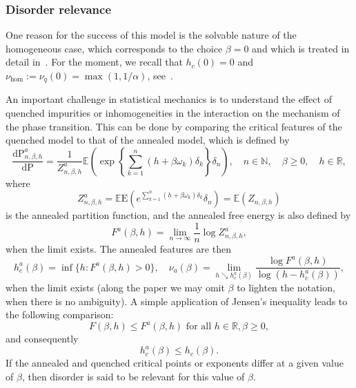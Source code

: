 \documentclass[10pt]{amsart}
\theoremstyle{definition}\newtheorem{defi}[theo]{Definition}\newtheorem{rema}[theo]{Remark}\newtheorem{exam}[theo]{Example}\newtheorem{exem}[theo]{Example}\newtheorem{nota}[theo]{Notation}
\newcommand{\bbE}{{\ensuremath{\mathbb E}}}
\newcommand{\bbN}{{\ensuremath{\mathbb N}}}
\newcommand{\bbR}{{\ensuremath{\mathbb R}}}
\newcommand{\ga}{\alpha}
\newcommand{\gb}{\beta}
\newcommand{\gd}{\delta}
\newcommand{\go}{\omega}
\newcommand{\dd}{\mathrm{d}}
\newcommand{\R}{\mathbb{R}}
\newcommand\bP{\ensuremath{\mathrm{P}}}
\newcommand\bE{\ensuremath{\mathrm{E}}}
\begin{document}
\subsubsection{Disorder relevance}

One reason for the success of this model is the solvable nature of the homogeneous case, which corresponds to the choice $\gb = 0$ and which is treated in detail in~\cite{Gi2007}. For the moment, we recall that $h_c(0) = 0$ and $\nu_{\hom}:= \nu_q(0) = \max(1,1/\ga)$, see~\cite[Theorem~2.1]{Gi2007}.

An important challenge in statistical mechanics is to understand the effect of quenched impurities or inhomogeneities in the interaction on the mechanism of the phase transition. This can be done by comparing the critical features of the quenched model to that of the annealed model, which is defined by
\begin{equation}\label{eq:defannmeas}
\frac{\dd \bP^a_{n,\gb,h}}{\dd \bP} = \frac{1}{Z^a_{n,\gb,h}} \bbE\left(\exp \left\{ \sum_{k=1}^n (h + \gb \go_k) \gd_k \right\} \gd_n \right), \quad n \in \bbN, \quad \gb \geq 0,\quad h \in \bbR,
\end{equation}
where
\begin{equation}\label{eq:defannpf}
Z^a_{n,\gb,h} = \bbE\bE\left(e^{\sum_{k=1}^n (h+ \gb \go_k)\gd_k} \gd_n\right) = \bbE (Z_{n, \gb, h})
\end{equation}
is the annealed partition function, and the annealed free energy is also defined by
\begin{equation}
F^a(\gb,h) = \lim_{n \to \infty} \frac{1}{n} \log Z^a_{n,\gb,h},
\end{equation}
when the limit exists. The annealed features are then
\begin{equation}
h^a_c(\gb) = \inf\{h \colon F^a(\gb,h) > 0\}, \quad \nu_a(\gb) = \lim_{h \searrow h_c^a(\gb)} \frac{\log F^a(\gb,h)}{\log (h - h_c^a(\gb))},
\end{equation}
when the limit exists (along the paper we may omit $\beta$ to lighten the notation, when there is no ambiguity). A simple application of Jensen's inequality leads to the following comparison:
\begin{equation}
F(\gb,h) \leq F^a(\gb,h) \text{ for all } h\in \R, \gb\ge0,
\end{equation}
and consequently
\begin{equation}
h_c^a(\gb) \leq h_c(\gb).
\end{equation}
If the annealed and quenched critical points or exponents differ at a given value of $\gb$, then disorder is said to be relevant for this value of $\beta$.
\end{document}
